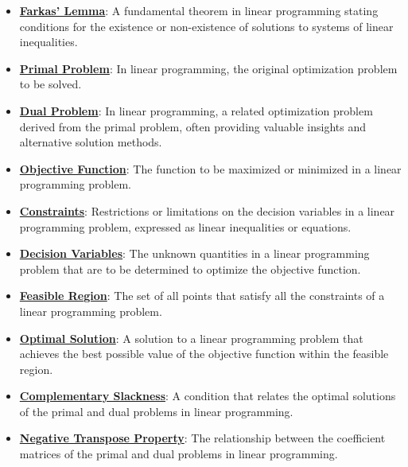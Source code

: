 \documentclass{article}%
\begin{document}
\begin{itemize}[leftmargin=*]
\item \href{https://www.math.purdue.edu/~yipn/421/2024-10-28-Farkas.pdf#page=1}{\textbf{Farkas' Lemma}}: A fundamental theorem in linear programming stating conditions for the existence or non-existence of solutions to systems of linear inequalities. %
\item \href{https://www.math.purdue.edu/~yipn/421/2024-10-28-Farkas.pdf#page=1}{\textbf{Primal Problem}}: In linear programming, the original optimization problem to be solved. %
\item \href{https://www.math.purdue.edu/~yipn/421/2024-10-28-Farkas.pdf#page=1}{\textbf{Dual Problem}}: In linear programming, a related optimization problem derived from the primal problem, often providing valuable insights and alternative solution methods. %
\item \href{https://www.math.purdue.edu/~yipn/421/2024-10-28-Farkas.pdf#page=1}{\textbf{Objective Function}}: The function to be maximized or minimized in a linear programming problem. %
\item \href{https://www.math.purdue.edu/~yipn/421/2024-10-28-Farkas.pdf#page=1}{\textbf{Constraints}}: Restrictions or limitations on the decision variables in a linear programming problem, expressed as linear inequalities or equations. %
\item \href{https://www.math.purdue.edu/~yipn/421/2024-10-28-Farkas.pdf#page=1}{\textbf{Decision Variables}}: The unknown quantities in a linear programming problem that are to be determined to optimize the objective function. %
\item \href{https://www.math.purdue.edu/~yipn/421/2024-10-28-Farkas.pdf#page=2}{\textbf{Feasible Region}}: The set of all points that satisfy all the constraints of a linear programming problem. %
\item \href{https://www.math.purdue.edu/~yipn/421/2024-10-28-Farkas.pdf#page=2}{\textbf{Optimal Solution}}: A solution to a linear programming problem that achieves the best possible value of the objective function within the feasible region. %
\item \href{https://www.math.purdue.edu/~yipn/421/2024-10-28-Farkas.pdf#page=2}{\textbf{Complementary Slackness}}: A condition that relates the optimal solutions of the primal and dual problems in linear programming. %
\item \href{https://www.math.purdue.edu/~yipn/421/2024-10-28-Farkas.pdf#page=2}{\textbf{Negative Transpose Property}}: The relationship between the coefficient matrices of the primal and dual problems in linear programming. %

\end{itemize}
\end{document}
